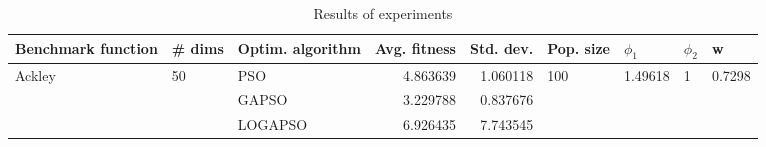 \begin{table}
\centering
\caption{Results of experiments}
\begin{tabular}{lllrrllll}
\toprule
     Benchmark function &             \# dims & Optim. algorithm &  Avg. fitness &  Std. dev. &            Pop. size &               $\phi_{1}$ &         $\phi_{2}$ &                       w \\
\midrule
\multirow{3}{*}{Ackley} & \multirow{3}{*}{50} &              PSO &      4.863639 &   1.060118 & \multirow{3}{*}{100} & \multirow{3}{*}{1.49618} & \multirow{3}{*}{1} & \multirow{3}{*}{0.7298} \\
                        &                     &            GAPSO &      3.229788 &   0.837676 &                      &                          &                    &                         \\
                        &                     &          LOGAPSO &      6.926435 &   7.743545 &                      &                          &                    &                         \\
\bottomrule
\end{tabular}
\end{table}
